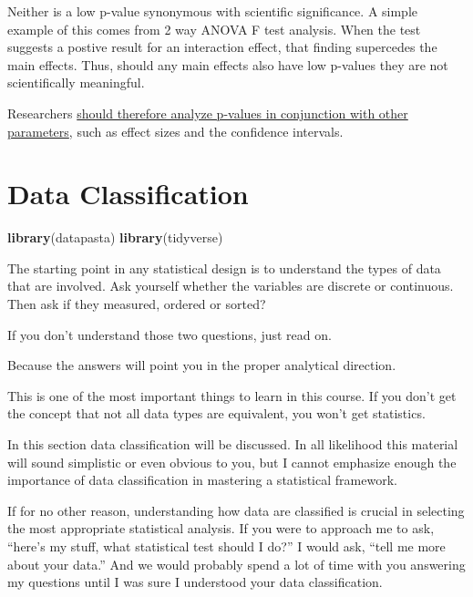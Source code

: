 \documentclass[]{book}
\newenvironment{Shaded}{\begin{snugshade}}{\end{snugshade}}
\newcommand{\KeywordTok}[1]{\textcolor[rgb]{0.13,0.29,0.53}{\textbf{#1}}}
\newcommand{\NormalTok}[1]{#1}
\begin{document}
Neither is a low p-value synonymous with scientific significance. A simple example of this comes from 2 way ANOVA F test analysis. When the test suggests a postive result for an interaction effect, that finding supercedes the main effects. Thus, should any main effects also have low p-values they are not scientifically meaningful.

Researchers \href{https://www.nature.com/articles/nmeth.4210}{should therefore analyze p-values in conjunction with other parameters}, such as effect sizes and the confidence intervals.

\hypertarget{data}{%
\chapter{Data Classification}\label{data}}

\begin{Shaded}
\begin{Highlighting}[]
\KeywordTok{library}\NormalTok{(datapasta)}
\KeywordTok{library}\NormalTok{(tidyverse)}
\end{Highlighting}
\end{Shaded}

The starting point in any statistical design is to understand the types of data that are involved. Ask yourself whether the variables are discrete or continuous. Then ask if they measured, ordered or sorted?

If you don't understand those two questions, just read on.

Because the answers will point you in the proper analytical direction.

This is one of the most important things to learn in this course. If you don't get the concept that not all data types are equivalent, you won't get statistics.

In this section data classification will be discussed. In all likelihood this material will sound simplistic or even obvious to you, but I cannot emphasize enough the importance of data classification in mastering a statistical framework.

If for no other reason, understanding how data are classified is crucial in selecting the most appropriate statistical analysis. If you were to approach me to ask, ``here's my stuff, what statistical test should I do?'' I would ask, ``tell me more about your data.'' And we would probably spend a lot of time with you answering my questions until I was sure I understood your data classification.
\end{document}
